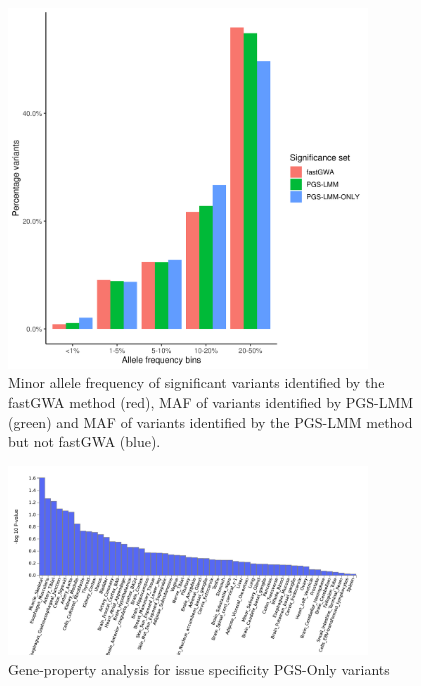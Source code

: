 \documentclass{article}
\begin{document}
\begin{figure}[h!]
  \includegraphics[width=0.85\textwidth]{images/SFig3.png}
  \caption{Minor allele frequency of significant variants identified by the fastGWA method (red), MAF of variants identified by PGS-LMM (green) and MAF of variants identified by the PGS-LMM method but not fastGWA (blue).}
\end{figure}

\begin{figure}[h!]
  \includegraphics[width=0.85\textwidth]{images/SFig4.png}
  \caption{Gene-property analysis for issue specificity PGS-Only variants}
\end{figure}
\end{document}
